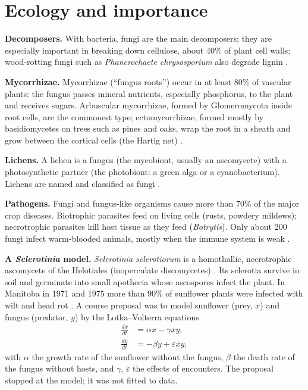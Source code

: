 \section{Ecology and importance}
\label{section-ecology}

\textbf{Decomposers.}
With bacteria, fungi are the main
decomposers; they are especially important
in breaking down cellulose, about 40\% of
plant cell walls; wood-rotting fungi such
as \emph{Phanerochaete chrysosporium} also
degrade lignin
\cite[Chapter 1]{deacon2006fungal}.

\textbf{Mycorrhizae.}
Mycorrhizae (``fungus roots'') occur in at
least 80\% of vascular plants: the fungus
passes mineral nutrients, especially
phosphorus, to the plant and receives
sugars. Arbuscular mycorrhizae, formed by
Glomeromycota inside root cells, are the
commonest type; ectomycorrhizae, formed
mostly by basidiomycetes on trees such as
pines and oaks, wrap the root in a sheath
and grow between the cortical cells (the
Hartig net)
\cite[Chapter 13]{deacon2006fungal}.

\textbf{Lichens.}
A lichen is a fungus (the mycobiont, usually
an ascomycete) with a photosynthetic partner
(the photobiont: a green alga or a
cyanobacterium). Lichens are named and
classified as fungi
\cite[Chapter 13]{deacon2006fungal}.

\textbf{Pathogens.}
Fungi and fungus-like organisms cause more
than 70\% of the major crop diseases.
Biotrophic parasites feed on living cells
(rusts, powdery mildews); necrotrophic
parasites kill host tissue as they feed
(\emph{Botrytis}). Only about 200 fungi
infect warm-blooded animals, mostly when the
immune system is weak
\cite[Chapter 1]{deacon2006fungal}.

\textbf{A \emph{Sclerotinia}
model.}
\emph{Sclerotinia sclerotiorum} is a
homothallic, necrotrophic ascomycete of the
Helotiales (inoperculate discomycetes)
\cite[Chapter 15]{webster2007fungi}.
Its sclerotia survive in soil and germinate
into small apothecia whose ascospores infect
the plant. In Manitoba in 1971 and 1975 more
than 90\% of sunflower plants were infected
with wilt and head rot
\cite[Section 4.4]{saharan2008sclerotinia}.
A course proposal was to model
sunflower (prey, $x$) and fungus (predator,
$y$) by the Lotka--Volterra equations
$$
\begin{aligned}
\frac{dx}{dt} &= \alpha x - \gamma x y, \\
\frac{dy}{dt} &= -\beta y + \varepsilon x y,
\end{aligned}
$$
with $\alpha$ the growth rate of the
sunflower without the fungus, $\beta$ the
death rate of the fungus without hosts, and
$\gamma$, $\varepsilon$ the effects of
encounters. The proposal stopped at the
model; it was not fitted to data.

